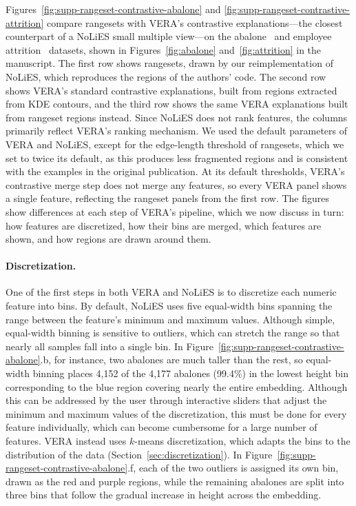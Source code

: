 \documentclass[10pt]{article}
\begin{document}
Figures~\ref{fig:supp-rangeset-contrastive-abalone} and \ref{fig:supp-rangeset-contrastive-attrition} compare rangesets with VERA's contrastive explanations---the closest counterpart of a NoLiES small multiple view---on the abalone~\cite{Nash1994} and employee attrition~\cite{IbmEmployeeAttrition} datasets, shown in Figures~\ref{fig:abalone} and~\ref{fig:attrition} in the manuscript.
The first row shows rangesets, drawn by our reimplementation of NoLiES, which reproduces the regions of the authors' code.
The second row shows VERA's standard contrastive explanations, built from regions extracted from KDE contours, and the third row shows the same VERA explanations built from rangeset regions instead.
Since NoLiES does not rank features, the columns primarily reflect VERA's ranking mechanism.
We used the default parameters of VERA and NoLiES, except for the edge-length threshold of rangesets, which we set to twice its default, as this produces less fragmented regions and is consistent with the examples in the original publication.
At its default thresholds, VERA's contrastive merge step does not merge any features, so every VERA panel shows a single feature, reflecting the rangeset panels from the first row.
The figures show differences at each step of VERA's pipeline, which we now discuss in turn: how features are discretized, how their bins are merged, which features are shown, and how regions are drawn around them.

\paragraph{Discretization.}
One of the first steps in both VERA and NoLiES is to discretize each numeric feature into bins.
By default, NoLiES uses five equal-width bins spanning the range between the feature's minimum and maximum values.
Although simple, equal-width binning is sensitive to outliers, which can stretch the range so that nearly all samples fall into a single bin. In Figure~\ref{fig:supp-rangeset-contrastive-abalone}.b, for instance, two abalones are much taller than the rest, so equal-width binning places 4,152 of the 4,177 abalones (99.4\%) in the lowest height bin corresponding to the blue region covering nearly the entire embedding.
Although this can be addressed by the user through interactive sliders that adjust the minimum and maximum values of the discretization, this must be done for every feature individually, which can become cumbersome for a large number of features. 
VERA instead uses $k$-means discretization, which adapts the bins to the distribution of the data (Section~\ref{sec:discretization}).
In Figure~\ref{fig:supp-rangeset-contrastive-abalone}.f, each of the two outliers is assigned its own bin, drawn as the red and purple regions, while the remaining abalones are split into three bins that follow the gradual increase in height across the embedding.
\end{document}
